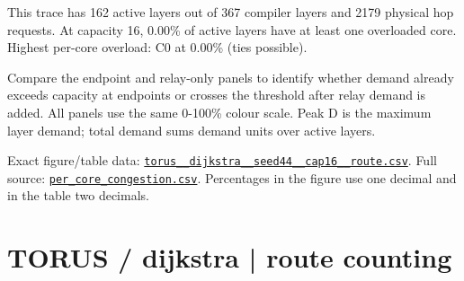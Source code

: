 \documentclass[10pt,a4paper]{article}
\begin{document}
This trace has 162 active layers out of 367 compiler layers and 2179 physical hop requests. At capacity 16, 0.00\% of active layers have at least one overloaded core. Highest per-core overload: C0 at 0.00\% (ties possible).\par
Compare the endpoint and relay-only panels to identify whether demand already exceeds capacity at endpoints or crosses the threshold after relay demand is added. All panels use the same 0-100\% colour scale. Peak D is the maximum layer demand; total demand sums demand units over active layers.\par
Exact figure/table data: \href{\detokenize{file:///home/dhruv-pansuriya/Documents/BTP/Compiler-Driven-ACE/output/pdf/qaoa_methods_congestion/tables/torus__dijkstra__seed44__cap16__route.csv}}{\nolinkurl{torus__dijkstra__seed44__cap16__route.csv}}. Full source: \href{\detokenize{file:///home/dhruv-pansuriya/Documents/BTP/Compiler-Driven-ACE/results/qaoa_2seed_2026-10-26/congestion/per_core_congestion.csv}}{\nolinkurl{per_core_congestion.csv}}. Percentages in the figure use one decimal and in the table two decimals.\par
\clearpage
\section*{TORUS / dijkstra | route counting}
\end{document}
